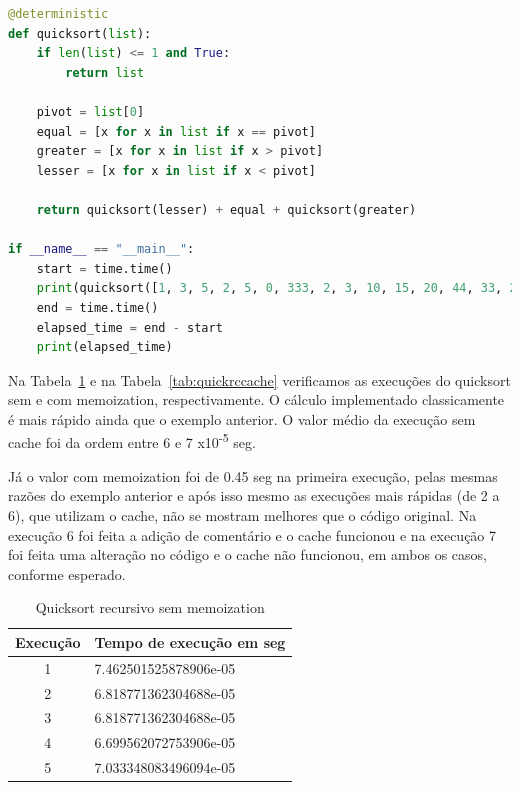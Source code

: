 \documentclass[sigconf]{acmart}
\begin{document}
\renewcommand{\lstlistingname}{Trecho de código}
\begin{lstlisting}[language=Python, caption=Quicksort]
@deterministic
def quicksort(list):
    if len(list) <= 1 and True:
        return list

    pivot = list[0]
    equal = [x for x in list if x == pivot]
    greater = [x for x in list if x > pivot]
    lesser = [x for x in list if x < pivot]

    return quicksort(lesser) + equal + quicksort(greater)
    
if __name__ == "__main__":
    start = time.time()
    print(quicksort([1, 3, 5, 2, 5, 0, 333, 2, 3, 10, 15, 20, 44, 33, 22, 64, 76, 87, 87, 98, 65, 100, 1234, 2, 345, 456, 343, 656, 767, 323, 4343, 6565, 6767, 8787, 9898, 98, 3434]))
    end = time.time()
    elapsed_time = end - start
    print(elapsed_time)
\end{lstlisting}

Na Tabela~\ref{tab:quickrscache} e na Tabela~\ref{tab:quickrccache} verificamos as execuções do quicksort sem e com memoization, respectivamente. O cálculo implementado classicamente é mais rápido ainda que o exemplo anterior. O valor médio da execução sem cache foi da ordem entre 6 e 7 x10\textsuperscript{-5} seg.

Já o valor com memoization foi de 0.45 seg na primeira execução, pelas mesmas razões do exemplo anterior e após isso mesmo as execuções mais rápidas (de 2 a 6), que utilizam o cache, não se mostram melhores que o código original. Na execução 6 foi feita a adição de comentário e o cache funcionou e na execução 7 foi feita uma alteração no código e o cache não funcionou, em ambos os casos, conforme esperado.

\begin{table}[H]
  \caption{Quicksort recursivo sem memoization}
  \label{tab:quickrscache}
  \begin{tabular}{cl}
    \toprule
    Execução & Tempo de execução em seg\\
    \midrule
    1 & 7.462501525878906e-05\\
    2 & 6.818771362304688e-05\\
    3 & 6.818771362304688e-05\\
    4 & 6.699562072753906e-05\\
    5 & 7.033348083496094e-05\\
  \bottomrule
\end{tabular}
\end{table}
\end{document}
